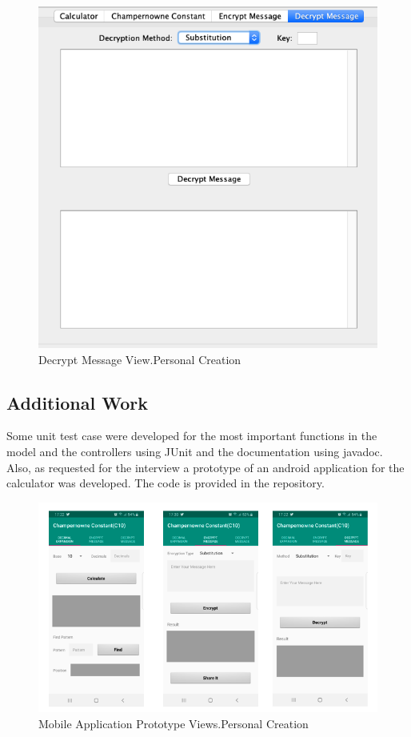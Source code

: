 \documentclass{report}
\begin{document}
\begin{figure}[H]
\centering
\includegraphics[scale=0.5]{images/DecryptMessage.png}
\caption[Decrypt Message View]{Decrypt Message View.Personal Creation}
\end{figure}

\subsection{Additional Work}

Some unit test case were developed for the most important functions in the model and the controllers using JUnit and the documentation using javadoc. Also, as requested for the interview a prototype of an android application for the calculator was developed. The code is provided in the repository.

\begin{figure}[H]
\centering
\includegraphics[scale=0.5]{images/Android.png}
\caption[Mobile Application Prototype Views]{Mobile Application Prototype Views.Personal Creation}
\end{figure}
\end{document}
